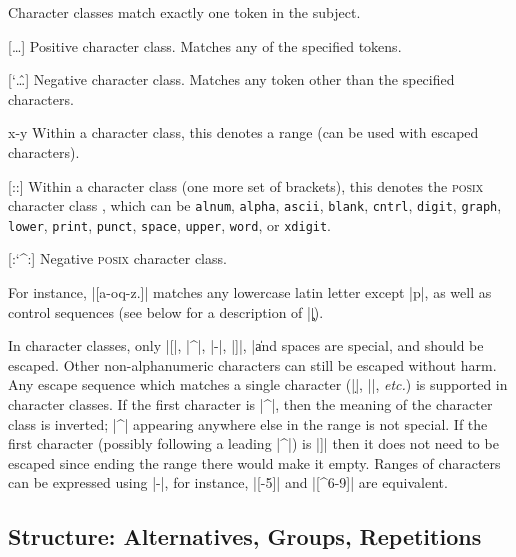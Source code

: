 \documentclass[oneside]{book}
\begin{document}
Character classes match exactly one token in the subject.
\begin{l3regex-syntax}
  \item[{[\ldots{}]}] Positive character class.
    Matches any of the specified tokens.
  \item[{[\char`\^\ldots{}]}] Negative character class.
    Matches any token other than the specified characters.
  \item[{x-y}] Within a character class, this denotes a range (can be
    used with escaped characters).
  \item[{[:\meta{name}:]}] Within a character class (one more set of
    brackets), this denotes the \textsc{posix} character class
    , which can be \texttt{alnum}, \texttt{alpha},
    \texttt{ascii}, \texttt{blank}, \texttt{cntrl}, \texttt{digit},
    \texttt{graph}, \texttt{lower}, \texttt{print}, \texttt{punct},
    \texttt{space}, \texttt{upper}, \texttt{word}, or \texttt{xdigit}.
  \item[{[:\char`\^\meta{name}:]}] Negative \textsc{posix} character class.
\end{l3regex-syntax}
For instance, |[a-oq-z\cC.]| matches any lowercase latin letter
except |p|, as well as control sequences (see below for a description
of |\c|).

In character classes, only |[|, |^|, |-|, |]|, |\| and spaces are
special, and should be escaped. Other non-alphanumeric characters can
still be escaped without harm. Any escape sequence which matches a
single character (|\d|, |\D|, \emph{etc.}) is supported in character
classes.  If the first character is |^|, then
the meaning of the character class is inverted; |^| appearing anywhere
else in the range is not special.  If the first character (possibly
following a leading |^|) is |]| then it does not need to be escaped
since ending the range there would make it empty.
Ranges of characters
can be expressed using |-|, for instance, |[-5]| and |[^6-9]| are
equivalent.

\subsection{Structure: Alternatives, Groups, Repetitions}
\end{document}
